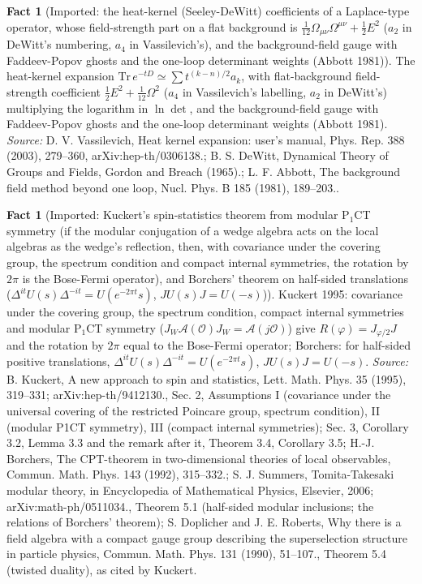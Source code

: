 \documentclass[11pt]{article}
\theoremstyle{definition}
\newtheorem{fact}[theorem]{Fact}
\theoremstyle{plain}
\begin{document}
\begin{fact}[Imported: the heat-kernel (Seeley-DeWitt) coefficients of a Laplace-type operator, whose field-strength part on a flat background is $\tfrac{1}{12}\Omega_{\mu\nu}\Omega^{\mu\nu} + \tfrac12E^{2}$ ($a_{2}$ in DeWitt's numbering, $a_{4}$ in Vassilevich's), and the background-field gauge with Faddeev-Popov ghosts and the one-loop determinant weights (Abbott 1981)]\label{c:synthesis.imported-heat-kernel-coefficients-and-background-field-gauge}
The heat-kernel expansion $\mathrm{Tr}\,e^{-tD} \simeq \sum t^{(k-n)/2}a_{k}$, with flat-background field-strength coefficient $\tfrac12E^{2} + \tfrac1{12}\Omega^{2}$ ($a_{4}$ in Vassilevich's labelling, $a_{2}$ in DeWitt's) multiplying the logarithm in $\ln\det$, and the background-field gauge with Faddeev-Popov ghosts and the one-loop determinant weights (Abbott 1981).
\emph{Source:} D. V. Vassilevich, Heat kernel expansion: user's manual, Phys. Rep. 388 (2003), 279--360, arXiv:hep-th/0306138.; B. S. DeWitt, Dynamical Theory of Groups and Fields, Gordon and Breach (1965).; L. F. Abbott, The background field method beyond one loop, Nucl. Phys. B 185 (1981), 189--203..
\end{fact}

\begin{fact}[Imported: Kuckert's spin-statistics theorem from modular P$_{1}$CT symmetry (if the modular conjugation of a wedge algebra acts on the local algebras as the wedge's reflection, then, with covariance under the covering group, the spectrum condition and compact internal symmetries, the rotation by $2\pi$ is the Bose-Fermi operator), and Borchers' theorem on half-sided translations ($\Delta^{it}U(s)\Delta^{-it} = U(e^{-2\pi t}s)$, $JU(s)J = U(-s)$)]\label{c:synthesis.imported-kuckert-modular-pct-spin-statistics-and-borchers-theorem}
Kuckert 1995: covariance under the covering group, the spectrum condition, compact internal symmetries and modular P$_{1}$CT symmetry ($J_{W}\mathcal{A}(\mathcal{O})J_{W} = \mathcal{A}(j\mathcal{O})$) give $R(\varphi) = J_{\varphi/2}J$ and the rotation by $2\pi$ equal to the Bose-Fermi operator; Borchers: for half-sided positive translations, $\Delta^{it}U(s)\Delta^{-it} = U(e^{-2\pi t}s)$, $JU(s)J = U(-s)$.
\emph{Source:} B. Kuckert, A new approach to spin and statistics, Lett. Math. Phys. 35 (1995), 319--331; arXiv:hep-th/9412130., Sec. 2, Assumptions I (covariance under the universal covering of the restricted Poincare group, spectrum condition), II (modular P1CT symmetry), III (compact internal symmetries); Sec. 3, Corollary 3.2, Lemma 3.3 and the remark after it, Theorem 3.4, Corollary 3.5; H.-J. Borchers, The CPT-theorem in two-dimensional theories of local observables, Commun. Math. Phys. 143 (1992), 315--332.; S. J. Summers, Tomita-Takesaki modular theory, in Encyclopedia of Mathematical Physics, Elsevier, 2006; arXiv:math-ph/0511034., Theorem 5.1 (half-sided modular inclusions; the relations of Borchers' theorem); S. Doplicher and J. E. Roberts, Why there is a field algebra with a compact gauge group describing the superselection structure in particle physics, Commun. Math. Phys. 131 (1990), 51--107., Theorem 5.4 (twisted duality), as cited by Kuckert.
\end{fact}
\end{document}
